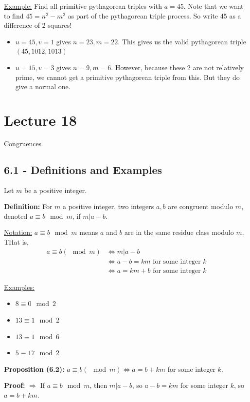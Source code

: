 \documentclass{article}
\begin{document}
\underline{Example:} Find all primitive pythagorean triples with $a=45$. Note that we want to find $45=n^2-m^2$ as part of the pythagorean triple process. So write 45 as a difference of 2 squares! \begin{itemize}
	\item $u=45, v=1$ gives $n=23, m=22$. This gives us the valid pythagorean triple $(45, 1012, 1013)$
	\item $u=15, v=3$ gives $n=9, m=6$. However, because these 2 are not relatively prime, we cannot get a primitive pythagorean triple from this. But they do give a normal one. 
\end{itemize}

\section{Lecture 18}

Congruences

\subsection{6.1 - Definitions and Examples} 

Let $m$ be a positive integer. 

\textbf{Definition:} For $m$ a positive integer, two integers $a,b$ are congruent modulo $m$, denoted $a\equiv b\mod m$, if $m|a-b$.

\underline{Notation:} $a\equiv b\mod m$ means $a$ and $b$ are in the same residue class modulo $m$. THat is, \begin{align*}
    a\equiv b(\mod m)&\iff m|a-b \\
    &\iff a-b=km \text{ for some integer } k \\
    &\iff a=km+b \text{ for some integer } k
\end{align*}

\underline{Examples:} \begin{itemize}
    \item $8\equiv 0\mod 2$
    \item $13\equiv 1\mod 2$
    \item $13\equiv 1\mod 6$
    \item $5\equiv 17\mod 2$
\end{itemize}

\textbf{Proposition (6.2):} $a\equiv b(\mod m)\iff a=b+km$ for some integer $k$.

\textbf{Proof:} $\Rightarrow$ If $a\equiv b\mod m$, then $m|a-b$, so $a-b=km$ for some integer $k$, so $a=b+km$.
\end{document}
